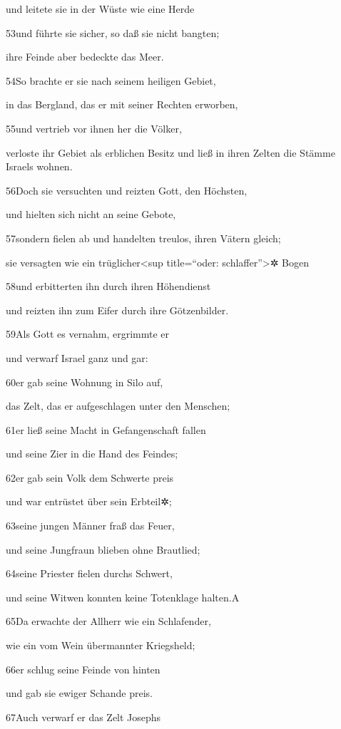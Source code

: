 und leitete sie in der Wüste wie eine Herde

53und führte sie sicher, so daß sie nicht bangten;

ihre Feinde aber bedeckte das Meer.

54So brachte er sie nach seinem heiligen Gebiet,

in das Bergland, das er mit seiner Rechten erworben,

55und vertrieb vor ihnen her die Völker,

verloste ihr Gebiet als erblichen Besitz und ließ in ihren Zelten die
Stämme Israels wohnen.

56Doch sie versuchten und reizten Gott, den Höchsten,

und hielten sich nicht an seine Gebote,

57sondern fielen ab und handelten treulos, ihren Vätern gleich;

sie versagten wie ein trüglicher\textless sup title=``oder:
schlaffer''\textgreater✲ Bogen

58und erbitterten ihn durch ihren Höhendienst

und reizten ihn zum Eifer durch ihre Götzenbilder.

59Als Gott es vernahm, ergrimmte er

und verwarf Israel ganz und gar:

60er gab seine Wohnung in Silo auf,

das Zelt, das er aufgeschlagen unter den Menschen;

61er ließ seine Macht in Gefangenschaft fallen

und seine Zier in die Hand des Feindes;

62er gab sein Volk dem Schwerte preis

und war entrüstet über sein Erbteil✲;

63seine jungen Männer fraß das Feuer,

und seine Jungfraun blieben ohne Brautlied;

64seine Priester fielen durchs Schwert,

und seine Witwen konnten keine Totenklage halten.{A}

65Da erwachte der Allherr wie ein Schlafender,

wie ein vom Wein übermannter Kriegsheld;

66er schlug seine Feinde von hinten

und gab sie ewiger Schande preis.

67Auch verwarf er das Zelt Josephs

